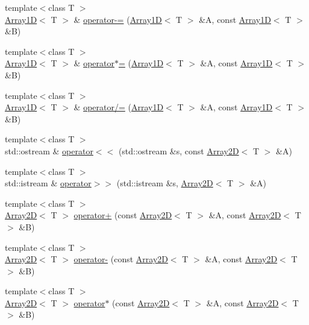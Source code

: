 \begin{DoxyCompactItemize}
\item 
{\footnotesize template$<$class T $>$ }\\\hyperlink{classTNT_1_1Array1D}{Array1D}$<$ T $>$ \& \hyperlink{namespaceTNT_a299b0b9df874413857065f22f8ca5a91}{operator-\/=} (\hyperlink{classTNT_1_1Array1D}{Array1D}$<$ T $>$ \&A, const \hyperlink{classTNT_1_1Array1D}{Array1D}$<$ T $>$ \&B)
\item 
{\footnotesize template$<$class T $>$ }\\\hyperlink{classTNT_1_1Array1D}{Array1D}$<$ T $>$ \& \hyperlink{namespaceTNT_a89bc7f14ed053648fc3cccef34955019}{operator$\ast$=} (\hyperlink{classTNT_1_1Array1D}{Array1D}$<$ T $>$ \&A, const \hyperlink{classTNT_1_1Array1D}{Array1D}$<$ T $>$ \&B)
\item 
{\footnotesize template$<$class T $>$ }\\\hyperlink{classTNT_1_1Array1D}{Array1D}$<$ T $>$ \& \hyperlink{namespaceTNT_a3be75d39e2081a4f4876050b36b29403}{operator/=} (\hyperlink{classTNT_1_1Array1D}{Array1D}$<$ T $>$ \&A, const \hyperlink{classTNT_1_1Array1D}{Array1D}$<$ T $>$ \&B)
\item 
{\footnotesize template$<$class T $>$ }\\std\+::ostream \& \hyperlink{namespaceTNT_a016e1f9f0eb43642e6d41748b4dd1199}{operator$<$$<$} (std\+::ostream \&s, const \hyperlink{classTNT_1_1Array2D}{Array2D}$<$ T $>$ \&A)
\item 
{\footnotesize template$<$class T $>$ }\\std\+::istream \& \hyperlink{namespaceTNT_a2856dd71c9307b44e65cc69a98a3b102}{operator$>$$>$} (std\+::istream \&s, \hyperlink{classTNT_1_1Array2D}{Array2D}$<$ T $>$ \&A)
\item 
{\footnotesize template$<$class T $>$ }\\\hyperlink{classTNT_1_1Array2D}{Array2D}$<$ T $>$ \hyperlink{namespaceTNT_a410445519880e60d6110b1678e701b20}{operator+} (const \hyperlink{classTNT_1_1Array2D}{Array2D}$<$ T $>$ \&A, const \hyperlink{classTNT_1_1Array2D}{Array2D}$<$ T $>$ \&B)
\item 
{\footnotesize template$<$class T $>$ }\\\hyperlink{classTNT_1_1Array2D}{Array2D}$<$ T $>$ \hyperlink{namespaceTNT_ad9068d45e117245c3ec39ee1f7f33f35}{operator-\/} (const \hyperlink{classTNT_1_1Array2D}{Array2D}$<$ T $>$ \&A, const \hyperlink{classTNT_1_1Array2D}{Array2D}$<$ T $>$ \&B)
\item 
{\footnotesize template$<$class T $>$ }\\\hyperlink{classTNT_1_1Array2D}{Array2D}$<$ T $>$ \hyperlink{namespaceTNT_a96071349bb182069d12392430b5113fe}{operator$\ast$} (const \hyperlink{classTNT_1_1Array2D}{Array2D}$<$ T $>$ \&A, const \hyperlink{classTNT_1_1Array2D}{Array2D}$<$ T $>$ \&B)

\end{DoxyCompactItemize}
